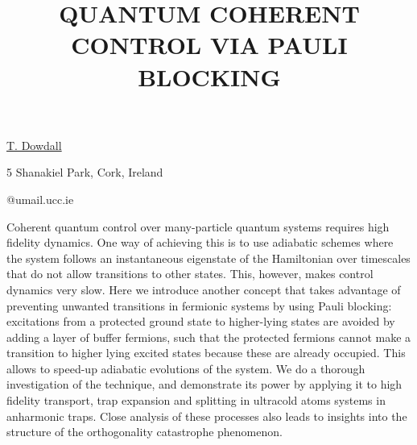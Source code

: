 \title{QUANTUM COHERENT CONTROL VIA PAULI BLOCKING}

\underline{T. Dowdall} 

{\normalsize{\vspace{-4mm}
5 Shanakiel Park,
Cork,
Ireland

@umail.ucc.ie}}

Coherent quantum control over many-particle quantum systems requires high fidelity dynamics. One way of achieving this is to use adiabatic schemes where the system follows an instantaneous eigenstate of the Hamiltonian over timescales that do not allow transitions to other states. This, however, makes control dynamics very slow. Here we introduce another concept that takes advantage of preventing unwanted transitions in fermionic systems by using Pauli blocking: excitations from a protected ground state to higher-lying states are avoided by adding a layer of buffer fermions, such that the protected fermions cannot make a transition to higher lying excited states because these are already occupied. This allows to speed-up adiabatic evolutions of the system. We do a thorough investigation of the technique, and demonstrate its power by applying it to high fidelity transport, trap expansion and splitting in ultracold atoms systems in anharmonic traps.
Close analysis of these processes also leads to insights into the structure of the orthogonality catastrophe phenomenon.

\vspace{\baselineskip} 
